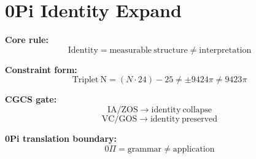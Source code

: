 \section*{0Pi Identity Expand}

\textbf{Core rule:}
\[
\mathrm{Identity} = \mathrm{measurable\ structure} \neq \mathrm{interpretation}
\]

\textbf{Constraint form:}
\[
\mathrm{Triplet\ N} = (N \cdot 24) - 25 \neq \pm 9424\pi \neq 9423\pi
\]

\textbf{CGCS gate:}
\[
\mathrm{IA/ZOS} \rightarrow \mathrm{identity\ collapse}
\]
\[
\mathrm{VC/GOS} \rightarrow \mathrm{identity\ preserved}
\]

\textbf{0Pi translation boundary:}
\[
0\Pi = \mathrm{grammar} \neq \mathrm{application}
\]
